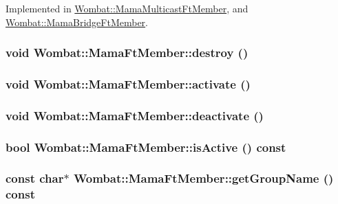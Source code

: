 Implemented in \hyperlink{classWombat_1_1MamaMulticastFtMember_abff24b52a220beafca46481139f66e67}{Wombat::MamaMulticastFtMember}, and \hyperlink{classWombat_1_1MamaBridgeFtMember_a9b6a49d95ab378ebab4ea353026acbce}{Wombat::MamaBridgeFtMember}.\hypertarget{classWombat_1_1MamaFtMember_acd39754cf01f3dc2bfd58de81066529e}{
\subsubsection[{destroy}]{\setlength{\rightskip}{0pt plus 5cm}void Wombat::MamaFtMember::destroy ()}}
\label{classWombat_1_1MamaFtMember_acd39754cf01f3dc2bfd58de81066529e}
\hypertarget{classWombat_1_1MamaFtMember_a91dbc23931995917b65c65b265d514ac}{
\subsubsection[{activate}]{\setlength{\rightskip}{0pt plus 5cm}void Wombat::MamaFtMember::activate ()}}
\label{classWombat_1_1MamaFtMember_a91dbc23931995917b65c65b265d514ac}
\hypertarget{classWombat_1_1MamaFtMember_aa24e0b13650e11700c4b5650f8beb190}{
\subsubsection[{deactivate}]{\setlength{\rightskip}{0pt plus 5cm}void Wombat::MamaFtMember::deactivate ()}}
\label{classWombat_1_1MamaFtMember_aa24e0b13650e11700c4b5650f8beb190}
\hypertarget{classWombat_1_1MamaFtMember_a01bdb68194841219fd08066b61052d59}{
\subsubsection[{isActive}]{\setlength{\rightskip}{0pt plus 5cm}bool Wombat::MamaFtMember::isActive () const}}
\label{classWombat_1_1MamaFtMember_a01bdb68194841219fd08066b61052d59}
\hypertarget{classWombat_1_1MamaFtMember_a2f82bbb437a4064fa2ba261453fc6d61}{
\subsubsection[{getGroupName}]{\setlength{\rightskip}{0pt plus 5cm}const char$\ast$ Wombat::MamaFtMember::getGroupName () const}}
